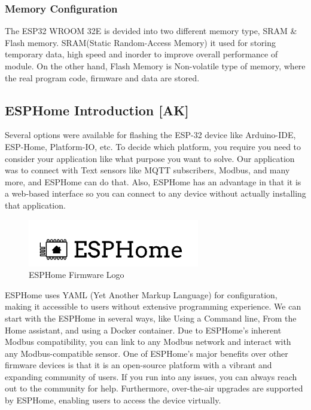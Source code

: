 		\subsubsection{Memory Configuration}
			The ESP32 WROOM 32E is devided into two different memory type, SRAM \& Flash memory. SRAM(Static Random-Access Memory) it used for storing temporary data, high speed and inorder to improve overall performance of module. On the other hand, Flash Memory is Non-volatile type of memory, where the real program code, firmware and data are stored.
		
	\subsection{ESPHome Introduction [AK]}
		Several options were available for flashing the ESP-32 device like Arduino-IDE, ESP-Home, Platform-IO, etc. To decide which platform, you require you need to consider your application like what purpose you want to solve. Our application was to connect with Text sensors like MQTT subscribers, Modbus, and many more, and ESPHome can do that. Also, ESPHome has an advantage in that it is a web-based interface so you can connect to any device without actually installing that application.
	
		\begin{figure}[H]
			\centering
			\includegraphics{assets/AK-esphome.png}
			\caption{ESPHome Firmware Logo}
			\label{fig:example}
		\end{figure}
	
	
		\setlength{\parindent}{0pt}
	
		ESPHome uses YAML (Yet Another Markup Language) for configuration, making it accessible to users without extensive programming experience. We can start with the ESPHome in several ways, like Using a Command line, From the Home assistant, and using a Docker container. Due to ESPHome’s inherent Modbus compatibility, you can link to any Modbus network and interact with any Modbus-compatible sensor. One of ESPHome's major benefits over other firmware devices is that it is an open-source platform with a vibrant and expanding community of users. If you run into any issues, you can always reach out to the community for help. Furthermore, over-the-air upgrades are supported by ESPHome, enabling users to access the device virtually.
		

